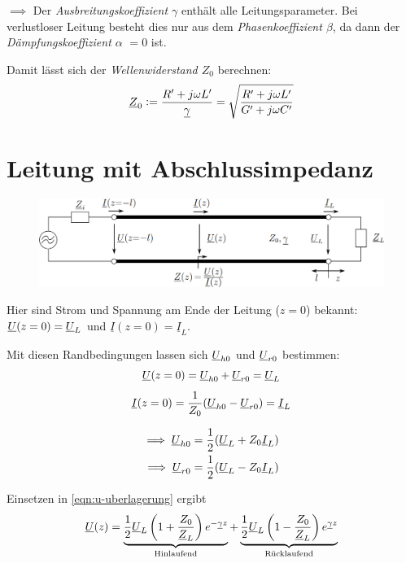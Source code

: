 $\implies$ Der \emph{Ausbreitungskoeffizient $\gamma$} enthält alle Leitungsparameter.
Bei verlustloser Leitung besteht dies nur aus dem \emph{Phasenkoeffizient $\beta$}, da dann der \emph{Dämpfungskoeffizient $\alpha$} $= 0$ ist.

Damit lässt sich der \emph{Wellenwiderstand $Z_0$} berechnen:
\begin{equation}
    \underline{Z}_0 := \frac{R'+j\omega L'}{\underline{\gamma}} = \sqrt{\frac{R'+j\omega L'}{G'+j\omega C'}}
\end{equation}



\section{Leitung mit Abschlussimpedanz}
\begin{figure}[H]
    \centering
    \includegraphics[width=\textwidth]{images/leitung_abschlussimpedanz.png}
\end{figure}
Hier sind Strom und Spannung am Ende der Leitung ($z=0$) bekannt: $\underline{U}(z=0)=\underline{U}_L$ und $\underline{I}(z=0)=\underline{I}_L$.

Mit diesen Randbedingungen lassen sich $\underline{U}_{h0}$ und $\underline{U}_{r0}$ bestimmen:
\begin{equation*}
    \underline{U}(z=0) = \underline{U}_{h0} + \underline{U}_{r0} = \underline{U}_L
\end{equation*}
\begin{equation*}
    \underline{I}(z=0) = \frac{1}{Z_0} (\underline{U}_{h0} - \underline{U}_{r0}) = \underline{I}_L
\end{equation*}

\begin{align}
    \implies \underline{U}_{h0} &= \frac{1}{2} (\underline{U}_L + Z_0 \underline{I}_L)\\
    \implies \underline{U}_{r0} &= \frac{1}{2} (\underline{U}_L - Z_0 \underline{I}_L)
\end{align}

Einsetzen in \eqref{eqn:u-uberlagerung} ergibt
\begin{equation}
    \underline{U}(z) = \underbrace{ \frac{1}{2} \underline{U}_L \left( 1 + \frac{Z_0}{\underline{Z}_L} \right) e^{-\underline{\gamma} z} }_{\text{Hinlaufend}} + \underbrace{ \frac{1}{2} \underline{U}_L \left( 1 - \frac{Z_0}{\underline{Z}_L} \right) e^{\underline{\gamma} z} }_{\text{Rücklaufend}}
    \label{eqn:u-uberlagerung-z}
\end{equation}

